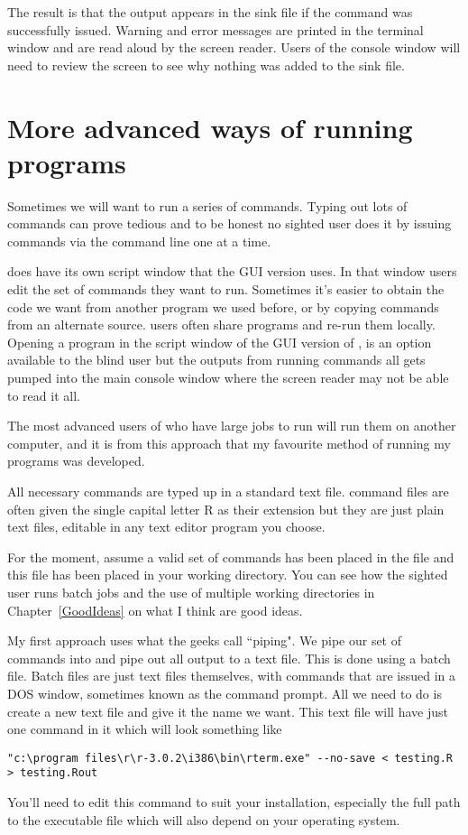The result is that the output appears in the sink file if the command was successfully issued. Warning and error messages are printed in the terminal window and are read aloud by the screen reader. Users of the \R{} console window will need to review the screen to see why nothing was added to the sink file.



\section{More advanced ways of running \R{} programs}

Sometimes we will want to run a series of commands. Typing out lots of commands can prove tedious and to be honest no sighted \R{} user does it by issuing commands via the command line one at a time.

\R{} does have its own script window that the GUI version uses. In that window users edit the set of commands they want to run. Sometimes it's easier to obtain the code we want from another \R{} program we used before, or by copying commands from an alternate source. \R{} users often share programs and re-run them locally. Opening a \R{} program in the script window of the GUI version of \R{}, is an option available to the blind user but the outputs from running commands all gets pumped into the main console window where the screen reader may not be able to read it all.

The most advanced users of \R{} who have large jobs to run will run them on another computer, and it is from this approach that my favourite method of running my \R{} programs was developed.

All necessary commands are typed up in a standard text file. \R{} command files are often given the single capital letter R as their extension but they are just plain text files, editable in any text editor program you choose.

For the moment, assume a valid set of commands has been placed in the file  and this file has been placed in your working directory. You can see how the sighted \R{} user runs batch jobs and the use of multiple working directories in Chapter~\ref{GoodIdeas} on what I think are good ideas.

My first approach uses what the geeks call ``piping". We pipe our set of commands into \R{} and pipe out all output to a text file. This is done using a batch file.
Batch files are just text files themselves, with commands that are issued in a DOS window, sometimes known as the command prompt. All we need to do is create a new text file and give it the name we want. This text file will have just one command in it which will look something like
\begin{verbatim}
"c:\program files\r\r-3.0.2\i386\bin\rterm.exe" --no-save < testing.R > testing.Rout
\end{verbatim}
You'll need to edit this command to suit your installation, especially the full path to the executable file which will also depend on your operating system.


